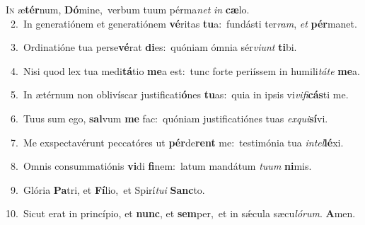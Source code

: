 \lettrine{\initial\textcolor{\initialcolor}{I}}{n} æ\-\textbf{tér}\-num, \textbf{Dó}\-mine,~\star verbum tuum pérma\textit{net} \textit{in} \textbf{cæ}\-lo.\\
{\numbfont\textcolor{\numbcolor}{~2.}}~In generatiónem et generatiónem \textbf{vé}\-ritas \textbf{tu}\-a:~\star fundásti ter\-\textit{ram}\-, \textit{et} \textbf{pér}\-manet.\par
{\numbfont\textcolor{\numbcolor}{~3.}}~Ordinatióne tua perse\-\textbf{vé}\-rat \textbf{di}\-es:~\star quóniam ómnia sér\-\textit{vi}\-\textit{unt} \textbf{ti}\-bi.\par
{\numbfont\textcolor{\numbcolor}{~4.}}~Nisi quod lex tua medi\-\textbf{tá}\-tio \textbf{me}\-a est:~\star tunc forte periíssem in humili\-\textit{tá}\-\textit{te} \textbf{me}\-a.\par
{\numbfont\textcolor{\numbcolor}{~5.}}~In ætérnum non oblivíscar justificati\-\textbf{ó}\-nes \textbf{tu}\-as:~\star quia in ipsis vi\-\textit{vi}\-\textit{fi}\textbf{cás}ti me.\par
{\numbfont\textcolor{\numbcolor}{~6.}}~Tuus sum ego, \textbf{sal}\-vum \textbf{me} fac:~\star quóniam justificatiónes tuas \textit{ex}\-\textit{qui}\textbf{sí}vi.\par
{\numbfont\textcolor{\numbcolor}{~7.}}~Me exspectavérunt peccatóres ut \textbf{pér}\-de\textbf{rent} me:~\star testimónia tua \textit{in}\-\textit{tel}\textbf{lé}xi.\par
{\numbfont\textcolor{\numbcolor}{~8.}}~Omnis consummatiónis \textbf{vi}\-di \textbf{fi}\-nem:~\star latum mandátum \textit{tu}\-\textit{um} \textbf{ni}\-mis.\par
{\numbfont\textcolor{\numbcolor}{~9.}}~Glória \textbf{Pa}\-tri, et \textbf{Fí}\-lio,~\star et Spirí\-\textit{tu}\-\textit{i} \textbf{Sanc}\-to.\par
{\numbfont\textcolor{\numbcolor}{10.}}~Sicut erat in princípio, et \textbf{nunc}\-, et \textbf{sem}\-per,~\star et in sǽcula sæcu\-\textit{ló}\-\textit{rum}. \textbf{A}\-men.\par
